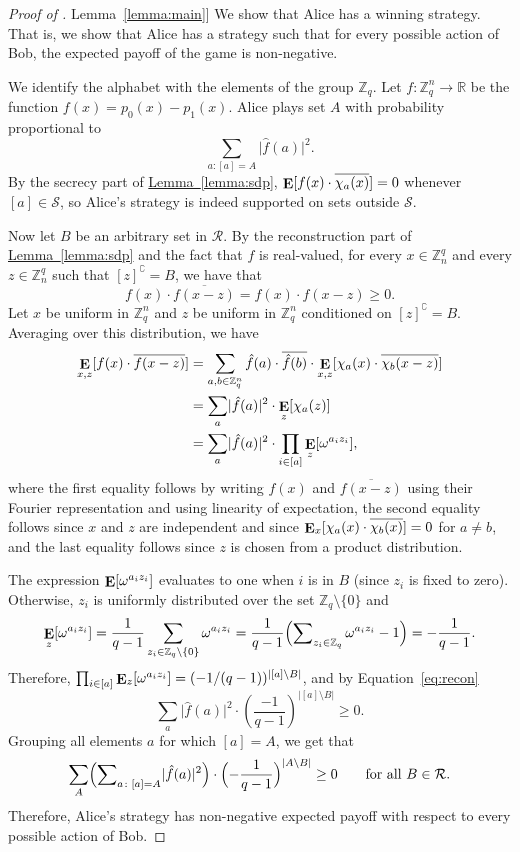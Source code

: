 \documentclass[11pt]{article}
\numberwithin{equation}{section}
\theoremstyle{definition}
\theoremstyle{plain}
\newcommand{\R}{\mathbb R}
\newcommand{\Z}{\mathbb Z}
\newcommand{\expref}[2]{\hyperref[#2]{#1~\ref{#2}}}
\DeclareMathOperator\E{\mathop{\bf E}}
\def\calS{\mathcal{S}}
\def\calR{\mathcal{R}}
\providecommand\abs[1]{\lvert#1\rvert}
\providecommand\compl[1]{#1^{\complement}}
\begin{document}
\begin{proof}[Proof of \expref{Lemma}{lemma:main}]
	We show that Alice has a winning strategy. That is, we show that Alice has a strategy such that for
	every possible action of Bob, the expected payoff of the game is non-negative.  
	
	We identify the alphabet with the elements of the group $\Z_q$. Let $f\colon \Z_q^n \to \R$ be the function $f(x) = p_0(x) - p_1(x)$.  Alice plays set $A$ with probability proportional to
        \[
          \sum_{a\colon [a] = A} \abs{\hat{f}(a)}^2.
        \]
        By the secrecy part of \expref{Lemma}{lemma:sdp},
        $\E[f(x) \cdot\overline{\chi_a(x)}] = 0$ whenever
        $[a] \in \calS$, so Alice's strategy is indeed supported on
        sets outside $\calS$.
	
	Now let $B$ be an arbitrary set in $\calR$.  By the reconstruction part of
	\expref{Lemma}{lemma:sdp} and the fact that $f$ is real-valued, for every
	$x\in\Z_n^q$ and every $z\in\Z_n^q$ such that $\compl{[z]} = B$, we have that
	\begin{equation}
	\label{eq:recon}
	f(x) \cdot \overline{f(x - z)} = f(x) \cdot f(x - z) \geq 0.
	\end{equation}
	Let $x$ be uniform in $\Z_q^n$ and $z$ be uniform in $\Z_q^n$ conditioned on $\compl{[z]} = B$.  Averaging over this distribution, we have
	\begin{align*}
	\E_{x,z}[f(x) \cdot \overline{f(x - z)}] 
	&= \sum_{a, b\in\Z_q^n} \hat{f}(a) \cdot \overline{\hat{f}(b)} \cdot\E_{x, z}[\chi_a(x)
	\cdot \overline{\chi_b(x - z)}] \\
	&= \sum_a \abs{\hat{f}(a)}^2 \cdot \E_z[\chi_a(z)] \\
	&= \sum_a \abs{\hat{f}(a)}^2 \cdot \prod_{i \in [a]} \E_z[\omega^{a_iz_i}],
	\end{align*}
	where the first equality follows by writing $f(x)$ and $\overline{f(x-z)}$ using
	their Fourier representation and using linearity of expectation, the second
	equality follows since $x$ and $z$ are independent and since $\E_{x}[\chi_a(x)
	\cdot \overline{\chi_b(x)}] = 0$ for $a\neq b$, and the last equality follows
	since $z$ is chosen from a product distribution.
	
	The expression $\E[\omega^{a_iz_i}]$ evaluates to one when $i$ is in $B$ (since
	$z_i$ is fixed to zero).  Otherwise, $z_i$ is uniformly distributed over the set
	$\Z_q \setminus \{0\}$ and
	\[ \E_z[\omega^{a_iz_i}] = \frac{1}{q - 1} \sum_{z_i \in \Z_q \setminus \{0\}} \omega^{a_iz_i} = 
	\frac{1}{q - 1}\Bigl(\sum\nolimits_{z_i \in \Z_q} \omega^{a_iz_i} - 1\Bigr) = -\frac{1}{q-1}. \]
	Therefore, $\prod_{i \in [a]} \E_z[\omega^{a_iz_i}] = (-1/(q-1))^{\abs{[a] \setminus B}}$, and by Equation~\eqref{eq:recon}
	\[\sum_a \abs{\hat{f}(a)}^2 \cdot \left(\frac{-1}{q-1}\right)^{\abs{[a] \setminus B}} \geq 0.\]
Grouping all elements $a$  for which $[a] = A$, we get that 
\[ \sum_A \Bigl(\sum\nolimits_{a\colon [a] = A} \abs{\hat{f}(a)}^2\Bigr) \cdot \Bigl(-\frac{1}{q-1} \Bigr)^{\abs{A \setminus B}} \geq 0 \qquad\text{for all $B \in \calR$.} \]
Therefore, Alice's strategy has non-negative expected payoff with respect to every possible action of Bob.
\end{proof}
\end{document}
